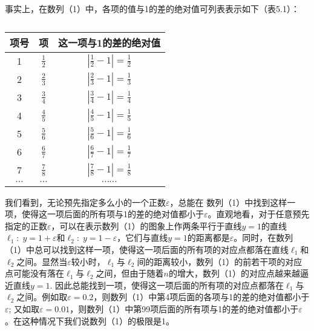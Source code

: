 事实上，在数列（1）中，各项的值与1的差的绝对值可列表表示如下（表5.1）：
\begin{table}[htp]
    \caption{}
    \centering\begin{tabular}{ccc}
\hline
        项号& 项 & 这一项与1的差的绝对值 \\
\hline
1   &$\frac{1}{2}$   &$\left|\frac{1}{2}-1\right|=\frac{1}{2}$\\ [1.5ex]
2   &$\frac{2}{3}$   &$\left|\frac{2}{3}-1\right|=\frac{1}{3}$\\[1.5ex]
3   &$\frac{3}{4}$   &$\left|\frac{3}{4}-1\right|=\frac{1}{4}$\\[1.5ex]
4   &$\frac{4}{5}$   &$\left|\frac{4}{5}-1\right|=\frac{1}{5}$\\[1.5ex]
5   &$\frac{5}{6}$   &$\left|\frac{5}{6}-1\right|=\frac{1}{6}$\\[1.5ex]
6   &$\frac{6}{7}$   &$\left|\frac{6}{7}-1\right|=\frac{1}{7}$\\[1.5ex]
7   &$\frac{7}{8}$   &$\left|\frac{7}{8}-1\right|=\frac{1}{8}$\\[1.5ex]
$\cdots $   &$\cdots $  &$\cdots\cdots $  \\
\hline
    \end{tabular}
\end{table}

我们看到，无论预先指定多么小的一个正数$\varepsilon$，总能在
数列（1）中找到这样一项，使得这一项后面的所有项与1的差的绝对值都小于$\varepsilon$。直观地看，对于任意预先指定的正数$\varepsilon$，可以在表示数列（1）的图象上作两条平行于直线$y=1$的直线$\ell_1:\; y=1+\varepsilon$和$\ell_2:\; y=1-\varepsilon$，它们与直线$y=1$的距离都是$\varepsilon$。同时，在数列（1）中总可以找到这样一项，使得这一项后面的所有项的对应点都落在直线$\ell_1$和$\ell_2$之间。显然当$\varepsilon$较小时，$\ell_1$与$\ell_2$间的距离较小，数列（1）的前若干项的对应点可能没有落在$\ell_1$与$\ell_2$之间，但由于随着$n$的增大，数列（1）的对应点越来越逼近直线$y=1$. 因此总能找到一项，使得这一项后面的所有项的对应点都落在$\ell_1$与$\ell_2$之间。例如取$\varepsilon=0.2$，则数列（1）中第4项后面的各项与1的差的绝对值都小于$\varepsilon$; 又如取$\varepsilon=0.01$，则数列（1）中第99项后面的所有项与1的差的绝对值都小于$\varepsilon$。在这种情况下我们说数列（1）的极限是1。


